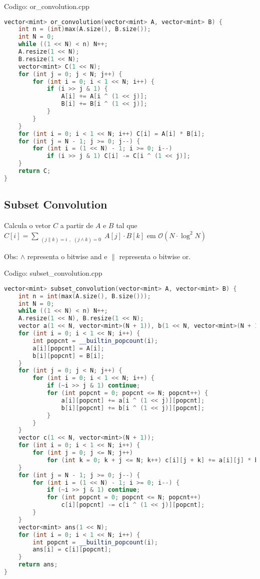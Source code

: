 \documentclass[10pt, a4paper, oneside]{book}
\begin{document}
\hfill

Codigo: or\_convolution.cpp

\begin{lstlisting}[language=C++]
vector<mint> or_convolution(vector<mint> A, vector<mint> B) {
    int n = (int)max(A.size(), B.size());
    int N = 0;
    while ((1 << N) < n) N++;
    A.resize(1 << N);
    B.resize(1 << N);
    vector<mint> C(1 << N);
    for (int j = 0; j < N; j++) {
        for (int i = 0; i < 1 << N; i++) {
            if (i >> j & 1) {
                A[i] += A[i ^ (1 << j)];
                B[i] += B[i ^ (1 << j)];
            }
        }
    }
    for (int i = 0; i < 1 << N; i++) C[i] = A[i] * B[i];
    for (int j = N - 1; j >= 0; j--) {
        for (int i = (1 << N) - 1; i >= 0; i--)
            if (i >> j & 1) C[i] -= C[i ^ (1 << j)];
    }
    return C;
}
\end{lstlisting}
\hfill

\subsection{Subset Convolution}


Calcula o vetor $C$ a partir de $A$ e $B$ tal que $C[i] = \sum_{\substack{(j \| k) = i}, \substack{(j \land k) = 0}} A[j] \cdot B[k]$ em $\mathcal{O}(N \cdot \log^2 N)$



Obs: $\land$ representa o bitwise and e $\|$ representa o bitwise or.

\hfill

Codigo: subset\_convolution.cpp

\begin{lstlisting}[language=C++]
vector<mint> subset_convolution(vector<mint> A, vector<mint> B) {
    int n = int(max(A.size(), B.size()));
    int N = 0;
    while ((1 << N) < n) N++;
    A.resize(1 << N), B.resize(1 << N);
    vector a(1 << N, vector<mint>(N + 1)), b(1 << N, vector<mint>(N + 1));
    for (int i = 0; i < 1 << N; i++) {
        int popcnt = __builtin_popcount(i);
        a[i][popcnt] = A[i];
        b[i][popcnt] = B[i];
    }
    for (int j = 0; j < N; j++) {
        for (int i = 0; i < 1 << N; i++) {
            if (~i >> j & 1) continue;
            for (int popcnt = 0; popcnt <= N; popcnt++) {
                a[i][popcnt] += a[i ^ (1 << j)][popcnt];
                b[i][popcnt] += b[i ^ (1 << j)][popcnt];
            }
        }
    }
    vector c(1 << N, vector<mint>(N + 1));
    for (int i = 0; i < 1 << N; i++) {
        for (int j = 0; j <= N; j++)
            for (int k = 0; k + j <= N; k++) c[i][j + k] += a[i][j] * b[i][k];
    }
    for (int j = N - 1; j >= 0; j--) {
        for (int i = (1 << N) - 1; i >= 0; i--) {
            if (~i >> j & 1) continue;
            for (int popcnt = 0; popcnt <= N; popcnt++)
                c[i][popcnt] -= c[i ^ (1 << j)][popcnt];
        }
    }
    vector<mint> ans(1 << N);
    for (int i = 0; i < 1 << N; i++) {
        int popcnt = __builtin_popcount(i);
        ans[i] = c[i][popcnt];
    }
    return ans;
}
\end{lstlisting}
\hfill
\end{document}
